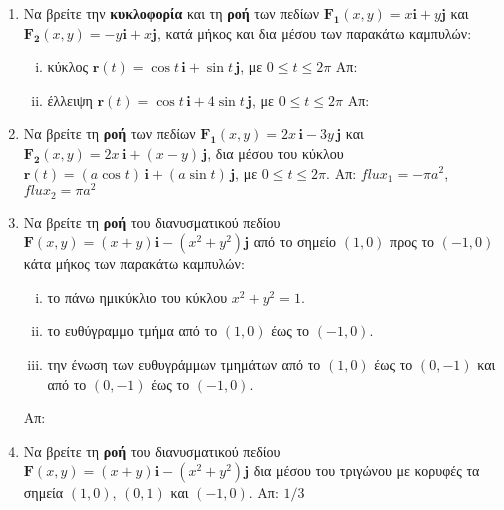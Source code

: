 \begin{enumerate}
  \item Να βρείτε την \textbf{κυκλοφορία} και τη \textbf{ροή} των πεδίων 
    $ \mathbf{F_{1}}(x,y) = x \mathbf{i} + y \mathbf{j} $ και $ \mathbf{F_{2}}(x,y) = 
    -y\mathbf{i} + x \mathbf{j} $, κατά μήκος και δια μέσου των παρακάτω καμπυλών:
    \begin{enumerate}[i)]
      \item κύκλος $ \mathbf{r}(t)= \cos{t}\, \mathbf{i} + \sin{t}\, \mathbf{j}$, με 
        $ 0 \leq t \leq 2 \pi $ 
        \hfill Απ: 
      \item έλλειψη $ \mathbf{r}(t)= \cos{t}\, \mathbf{i} + 4\sin{t}\, \mathbf{j}$, με 
        $ 0 \leq t \leq 2 \pi $ 
        \hfill Απ:  
    \end{enumerate}

  \item Να βρείτε τη \textbf{ροή} των πεδίων $ \mathbf{F_{1}}(x,y) = 2x \,\mathbf{i} - 3y
    \, \mathbf{j} $ και $ \mathbf{F_{2}}(x,y) = 
    2x \, \mathbf{i} + (x-y)\, \mathbf{j} $, δια μέσου του κύκλου $ \mathbf{r}(t)=(a
    \cos{t})\,
    \mathbf{i} + (a \sin{t})\, \mathbf{j} $, με $ 0 \leq t \leq 2 \pi $.
    \hfill Απ: $ flux_{1}=- \pi a^{2} $, $ flux_{2}= \pi a^{2} $ 

  \item Να βρείτε τη \textbf{ροή} του διανυσματικού πεδίου $ \mathbf{F}(x,y) = (x+y) 
    \mathbf{i} - (x^{2}+y^{2}) \mathbf{j} $ από το σημείο $ (1,0) $ προς το $ (-1,0) $ 
    κάτα μήκος των παρακάτω καμπυλών:
    \begin{enumerate}[i)]
      \item το πάνω ημικύκλιο του κύκλου $ x^{2}+y^{2}=1 $.
      \item το ευθύγραμμο τμήμα από το $ (1,0) $ έως το $ (-1,0) $.
      \item την ένωση των ευθυγράμμων τμημάτων από το $ (1,0) $ έως το $ (0,-1) $ και 
        από το $ (0,-1) $ έως το $ (-1,0) $.
    \end{enumerate}
    \hfill Απ: 

  \item Να βρείτε τη \textbf{ροή} του διανυσματικού πεδίου 
    $ \mathbf{F}(x,y) = (x+y) \mathbf{i} - (x^{2}+y^{2}) \mathbf{j} $ δια μέσου 
    του τριγώνου με κορυφές τα σημεία $ (1,0) $, $ (0,1) $ και $ (-1,0) $. 
    \hfill Απ: $1/3$ 

\end{enumerate}






